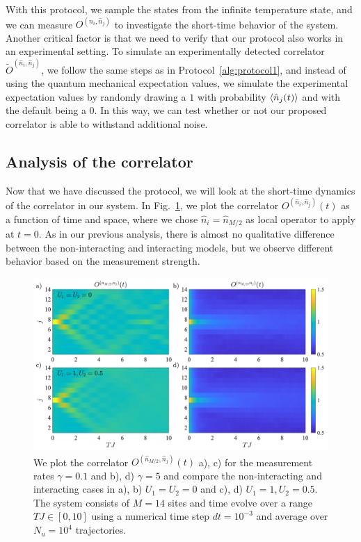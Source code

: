 With this protocol, we sample the states from the infinite temperature state, and we can measure $O^{(\hat{n}_i,\hat{n}_j)}$ to investigate the short-time behavior of the system. Another critical factor is that we need to verify that our protocol also works in an experimental setting. To simulate an experimentally detected correlator $\tilde{O}^{(\hat{n}_i,\hat{n}_j)}$, we follow the same steps as in Protocol~\ref{alg:protocol1}, and instead of using the quantum mechanical expectation values, we simulate the experimental expectation values by randomly drawing a $1$ with probability $\langle\hat{n}_j(t)\rangle$ and with the default being a $0$. In this way, we can test whether or not our proposed correlator is able to withstand additional noise. 

\subsection{Analysis of the correlator}

Now that we have discussed the protocol, we will look at the short-time dynamics of the correlator in our system. In Fig.~\ref{fig:Chapter5_Fig4}, we plot the correlator $O^{(\hat{n}_i,\hat{n}_j)}(t)$ as a function of time and space, where we chose $\hat{n}_i = \hat{n}_{M/2}$ as local operator to apply at $t=0$. As in our previous analysis, there is almost no qualitative difference between the non-interacting and interacting models, but we observe different behavior based on the measurement strength.

\begin{figure}[ht]
    \centering
    \includegraphics[width=\textwidth]{Chapters/Plots/Chapter6/Chapter5_Fig4.pdf}
    \caption{We plot the correlator $O^{(\hat{n}_{M/2},\hat{n}_j)}(t)$ a), c) for the measurement rates $\gamma = 0.1$ and b), d) $\gamma = 5$ and compare the non-interacting and interacting cases in a), b) $U_1 = U_2 = 0$ and c), d) $U_1 = 1, U_2 = 0.5$. The system consists of $M=14$ sites and time evolve over a range $TJ \in [0, 10]$ using a numerical time step $dt = 10^{-3}$ and average over $N_u = 10^4$ trajectories.}
    \label{fig:Chapter5_Fig4}
\end{figure}

